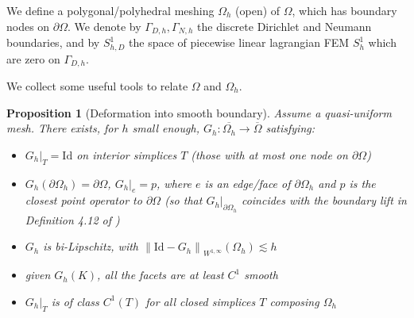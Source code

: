 \documentclass[english,a4paper,10pt,oneside]{scrbook}	%
\theoremstyle{break}
\newtheorem{prop}[equation]{Proposition}
\theoremstyle{remark}
\newcommand{\norm}[1]{\left\lVert#1\right\rVert}
\newcommand{\id}{\text{Id}}
\begin{document}
We define a polygonal/polyhedral meshing $\Omega_h$ (open) of $\Omega$, which has boundary nodes on $\partial \Omega$. We denote by $\Gamma_{D,h}, \Gamma_{N,h}$ the discrete Dirichlet and Neumann boundaries, and by $S^1_{h,D} $ the space of piecewise linear lagrangian FEM $S^1_h$ which are zero on $\Gamma_{D,h}$.

We collect some useful tools to relate $\Omega$ and $\Omega_h$.

\begin{prop}[Deformation into smooth boundary]
\label{prop:G_h}
Assume a quasi-uniform mesh. There exists, for $h$ small enough, $G_h: \overline{\Omega_h} \rightarrow \overline{\Omega}$ satisfying:

\begin{itemize}
	\item $G_h|_T = \id$ on interior simplices $T$ (those with at most one node on $\partial \Omega$)
	\item $G_h(\partial \Omega_h) = \partial \Omega$, $G_h|_e=p$, where $e$ is an edge/face of $\partial \Omega_h$ and $p$ is the closest point operator to $\partial \Omega$ (so that $G_h|_{\partial \Omega_h}$ coincides with the boundary lift in Definition 4.12 of \cite{elliott})
	\item $G_h$ is bi-Lipschitz, with $\norm{\id -G_h}_{W^{1,\infty}}(\Omega_h)\lesssim h$
	\item given $G_h(K)$, all the facets are at least $C^1$ smooth
	\item $G_h|_T$ is of class $C^1(T)$ for all closed simplices $T$ composing $\Omega_h$
\end{itemize}

\end{prop}
\end{document}

